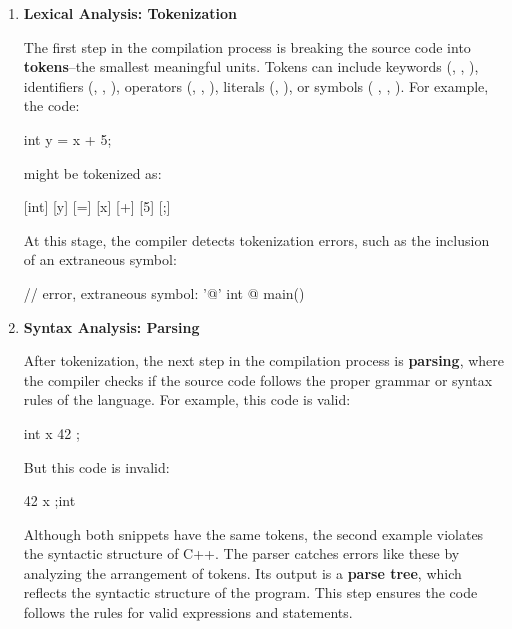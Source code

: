 \documentclass[12pt]{article}
\begin{document}
\begin{enumerate}

\item{\textbf{Lexical Analysis: Tokenization}}

\noindent
The first step in the compilation process is breaking the source code into \textbf{tokens}--the smallest meaningful units.
Tokens can include keywords (, , ), identifiers (, , ), operators (\inlinecxx{+}, \inlinecxx{=}, \inlinecxx{&&}), literals (, ), or symbols (\inlinecxx{\{} , \inlinecxx{;}, \inlinecxx{]}).
For example, the code:

\begin{cxx}{}
int y = x + 5;
\end{cxx}

\noindent
might be tokenized as:

\begin{cxx}{}
[int] [y] [=] [x] [+] [5] [;]
\end{cxx}

\noindent
At this stage, the compiler detects tokenization errors, such as the inclusion of an extraneous symbol:

\begin{cxx}{}
// error, extraneous symbol: '@'
int @ main()
{
}
\end{cxx}

\item{\textbf{Syntax Analysis: Parsing}}

\noindent
After tokenization, the next step in the compilation process is \textbf{parsing}, where the compiler checks if the source code follows the proper grammar or syntax rules of the language.
For example, this code is valid:

\begin{cxx}{}
int x { 42 };
\end{cxx}

\noindent
But this code is invalid:

\begin{cxx}{}
42 {} x  ;int
\end{cxx}

\noindent
Although both snippets have the same tokens, the second example violates the syntactic structure of C++.
The parser catches errors like these by analyzing the arrangement of tokens.
Its output is a \textbf{parse tree}, which reflects the syntactic structure of the program.
This step ensures the code follows the rules for valid expressions and statements.


\end{enumerate}
\end{document}
